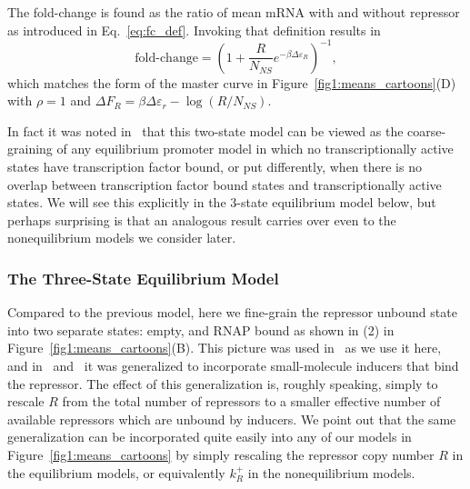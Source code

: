 The fold-change is  found as the ratio of mean mRNA with and without repressor
as introduced in Eq.~\ref{eq:fc_def}. Invoking that definition results in
\begin{equation}
\text{fold-change}
= \left(1 + \frac{R}{N_{NS}} e^{-\beta\Delta\varepsilon_R}\right)^{-1},
\end{equation}
which matches the form of the master curve in
Figure~\ref{fig1:means_cartoons}(D) with $\rho=1$ and $\Delta F_R = 
\beta\Delta\varepsilon_r - \log (R / N_{NS})$.

In fact it was noted in~\cite{Chure2019} that this two-state model can be viewed
as the coarse-graining of any equilibrium promoter model in which no
transcriptionally active states have transcription factor bound, or put
differently, when there is no overlap between
transcription factor bound states and transcriptionally
active states. We will see this explicitly in the 3-state equilibrium model
below, but perhaps surprising is that an analogous result carries over even to
the nonequilibrium models we consider later.

\subsubsection{The Three-State Equilibrium Model}
Compared to the previous model, here we fine-grain the repressor unbound state
into two separate states: empty, and RNAP bound as shown in (2) in
Figure~\ref{fig1:means_cartoons}(B). This picture was used in~\cite{Garcia2011a}
as we use it here, and in~\cite{Razo-Mejia2018} and~\cite{Chure2019} it was
generalized to incorporate small-molecule inducers that bind the repressor. 
The effect of this generalization is, roughly speaking,
simply to rescale $R$ from the total number of repressors to a smaller
effective number of available repressors which are unbound by inducers.
We point out that the same generalization can be incorporated quite easily
into any of our models in Figure~\ref{fig1:means_cartoons} by simply
rescaling the repressor copy number $R$ in the equilibrium models, or
equivalently $k_R^+$ in the nonequilibrium models.

